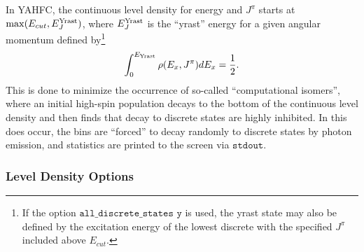 \documentclass[
10pt,
showpacs,preprintnumbers,footinbib,
amsfonts,amsmath,amssymb,
aps,
prc,twocolumn,groupedaddress,superscriptaddress,
showkeys,
nofootinbib
]{revtex4-1}
\begin{document}
In YAHFC, the continuous level density for energy and $J^\pi$ starts at  $\max(E_{cut},E_J^{\rm Yrast})$, where $E_J^{\rm Yrast}$ is the ``yrast'' energy for a given angular momentum defined by\footnote{If the option ${\texttt{all\_discrete\_states y}}$ is used, the yrast state may also be defined by the excitation energy of the lowest discrete with the specified $J^\pi$ included above $E_{cut}$. }
\begin{equation}
\int_0^{E_{\rm Yrast}} \rho(E_x,J^\pi) dE_x = \frac{1}{2}. 
\end{equation}
This is done to minimize the occurrence of so-called ``computational isomers'', where an initial high-spin population decays to the bottom of the continuous level density and then finds that decay to discrete states are highly inhibited. In this does occur, the bins are ``forced'' to decay randomly to discrete states by photon emission, and statistics are printed to the screen via ${\texttt{stdout}}$.

\subsubsection{Level Density Options}
\end{document}
